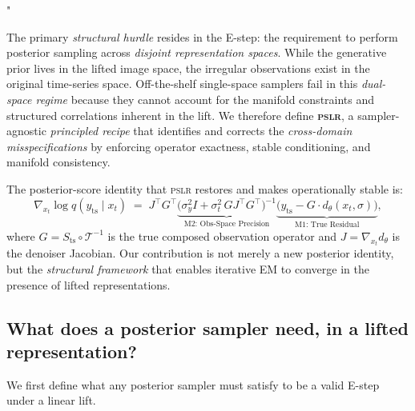 "\documentclass{article}
\theoremstyle{plain}
\theoremstyle{definition}
\theoremstyle{remark}
\newcommand{\imgts}{\mathcal{T}^{-1}}
\newcommand{\pslr}{\textsc{pslr}}
\newcommand{\yts}{y_{\mathrm{ts}}}
\begin{document}
The primary \emph{structural hurdle} resides in the E-step: the requirement to perform posterior sampling across \emph{disjoint representation spaces}. While the generative prior lives in the lifted image space, the irregular observations exist in the original time-series space. Off-the-shelf single-space samplers fail in this \emph{dual-space regime} because they cannot account for the manifold constraints and structured correlations inherent in the lift. We therefore define \textbf{\pslr{}}, a sampler-agnostic \emph{principled recipe} that identifies and corrects the \emph{cross-domain misspecifications} by enforcing operator exactness, stable conditioning, and manifold consistency.

The posterior-score identity that \pslr{} restores and makes operationally stable is:
\begin{equation}
\label{eq:pslr-score}
\nabla_{x_t} \log q(\yts \mid x_t) \;=\; J^\top G^\top \underbrace{\bigl(\sigma_y^2 I + \sigma_t^2 \, G J^\top G^\top\bigr)^{-1}}_{\text{M2: Obs-Space Precision}} \underbrace{\bigl(\yts - G \cdot d_\theta(x_t, \sigma)\bigr)}_{\text{M1: True Residual}},
\end{equation}
where $G = S_{\mathrm{ts}} \circ \imgts$ is the true composed observation operator and $J = \nabla_{x_t} d_\theta$ is the denoiser Jacobian. Our contribution is not merely a new posterior identity, but the \emph{structural framework} that enables iterative EM to converge in the presence of lifted representations.

\vspace{-1mm}
\subsection{What does a posterior sampler need, in a lifted representation?}
\label{subsec:requirements}
\vspace{-1mm}

We first define what any posterior sampler must satisfy to be a valid E-step under a linear lift.
\end{document}
